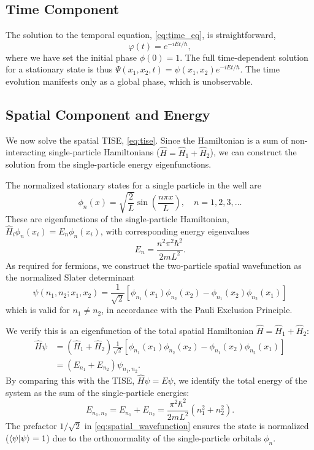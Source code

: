 \subsection{Time Component}
The solution to the temporal equation, \cref{eq:time_eq}, is
straightforward,
\begin{equation}
	\varphi(t) = e^{-iEt/\hbar},
\end{equation}
where we have set the initial phase $\phi(0) = 1$.
The full time-dependent solution for a stationary state is thus
$\Psi(x_1, x_2, t) = \psi(x_1, x_2) e^{-iEt/\hbar}$. The time evolution
manifests only as a global phase, which is unobservable.

\subsection{Spatial Component and Energy}
We now solve the spatial TISE, \cref{eq:tise}. Since the Hamiltonian
is a sum of non-interacting single-particle Hamiltonians
($\hat{H} = \hat{H}_1 + \hat{H}_2$), we can construct the solution
from the single-particle energy eigenfunctions.

The normalized stationary states for a single particle in the well are
\begin{equation}
	\phi_n(x) = \sqrt{\frac{2}{L}} \sin\left(\frac{n\pi x}{L}\right),
	\quad n = 1, 2, 3, \dots
\end{equation}
These are eigenfunctions of the single-particle Hamiltonian,
$\hat{H}_i {\phi}_n(x_i) = E_n {\phi}_n(x_i)$,
with corresponding energy eigenvalues
\begin{equation}
	E_n = \frac{n^2 \pi^2 \hbar^2}{2mL^2}.
\end{equation}
As required for fermions, we construct the two-particle spatial
wavefunction as the normalized Slater determinant
\begin{equation} \label{eq:spatial_wavefunction}
	\psi{(n_1, n_2 ; x_1, x_2)} = \frac{1}{\sqrt{2}} \left[
		{\phi}_{n_1}(x_1){\phi}_{n_2}(x_2) -
		{\phi}_{n_1}(x_2){\phi}_{n_2}(x_1)
	\right]
\end{equation}
which is valid for $n_1 \neq n_2$, in accordance with the
Pauli Exclusion Principle.

We verify this is an eigenfunction of the total spatial Hamiltonian
$\hat{H} = \hat{H}_1 + \hat{H}_2$:
\begin{align}
	\hat{H} \psi
		&= (\hat{H}_1 + \hat{H}_2) \frac{1}{\sqrt{2}} \left[
			{\phi}_{n_1}(x_1){\phi}_{n_2}(x_2) -
		{\phi}_{n_1}(x_2){\phi}_{n_2}(x_1) \right] \nonumber \\
		&= (E_{n_1} + E_{n_2}) \psi_{n_1, n_2}.
\end{align}
By comparing this with the TISE, $\hat{H}\psi = E\psi$, we identify the
total energy of the system as the sum of the single-particle energies:
\begin{equation}
	E_{n_1, n_2} = E_{n_1} + E_{n_2} =
	\frac{\pi^2 \hbar^2}{2mL^2} (n_1^2 + n_2^2).
\end{equation}
The prefactor $1/\sqrt{2}$ in \cref{eq:spatial_wavefunction} ensures
the state is normalized ($\braket{\psi | \psi} = 1$) due to the
orthonormality of the single-particle orbitals ${\phi}_n$.

